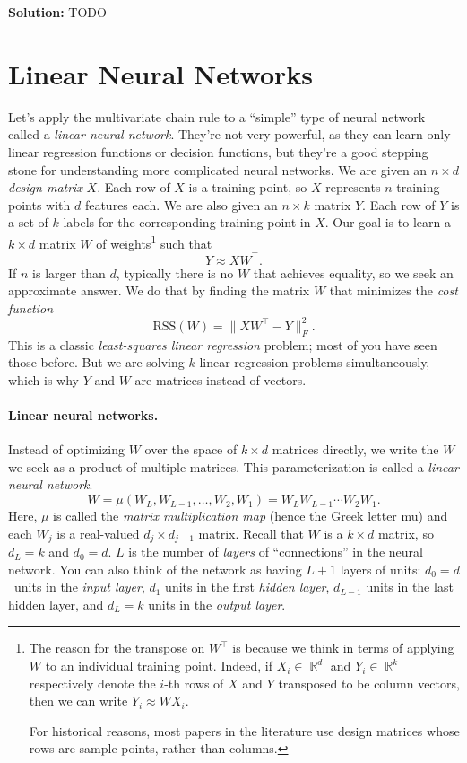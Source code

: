 \documentclass{article}
\newcommand{\Question}[1]{\Large \section{ #1 } \normalsize}
\DeclareMathOperator{\R}{\mathbb{R}}
\newenvironment{solution}{\color{blue} \smallskip \textbf{Solution:}}{}
\begin{document}
\begin{enumerate}
    \begin{solution}
        TODO
    \end{solution}

\end{enumerate}

\newpage
\Question{Linear Neural Networks}
Let's apply the multivariate chain rule to a ``simple'' type of neural network called a {\em linear neural network}.
They're not very powerful, as they can learn only linear regression functions or decision functions, but they're a good stepping stone for understanding more complicated neural networks.
We are given an $n \times d$ {\em design matrix} $X$.
Each row of $X$ is a training point, so $X$ represents $n$ training points with $d$ features each.
We are also given an $n \times k$ matrix $Y$.
Each row of $Y$ is a set of $k$ labels for the corresponding training point in $X$.
Our goal is to learn a $k \times d$ matrix $W$ of weights\footnote{The reason for the transpose on $W^\top$ is because we think
in terms of applying $W$ to an individual training point.
Indeed, if $X_i \in \R^d$ and $Y_i \in \R^k$
respectively denote the $i$-th rows of $X$ and $Y$ transposed to be column vectors, then 
we can write $Y_i \approx W X_i$.

For historical reasons, most papers in the literature use design matrices
whose rows are sample points, rather than columns.} such that
\[
    Y \approx X W^\top.
\]
If $n$ is larger than $d$, typically there is no $W$ that achieves equality,
so we seek an approximate answer.
We do that by finding the matrix $W$ that minimizes the \textit{cost function}
\begin{equation}
    \mathrm{RSS}(W) = \| X W^\top - Y \|^2_F.
    \label{eq:rss}
\end{equation}
This is a classic {\em least-squares linear regression} problem; most of you have seen those before.
But we are solving $k$ linear regression problems simultaneously, which is why $Y$ and $W$ are matrices instead of vectors.

\paragraph{Linear neural networks.}
Instead of optimizing $W$ over the space of ${k \times d}$ matrices directly, we write the $W$ we seek as a product of multiple matrices.
This parameterization is called a \textit{linear neural network}.
\[
    W = \mu(W_L, W_{L-1}, \ldots, W_2, W_1) = W_L W_{L-1} \cdots W_2 W_1.
\]
Here, $\mu$ is called the {\em matrix multiplication map} (hence the Greek letter mu) and each $W_j$ is a real-valued $d_j \times d_{j-1}$ matrix.
Recall that $W$ is a $k \times d$ matrix, so $d_L = k$ and $d_0 = d$.
$L$ is the number of {\em layers} of ``connections'' in the neural network.
You can also think of the network as having $L + 1$ layers of units:
$d_0 = d$~units in the {\em input layer},
$d_1$ units in the first {\em hidden layer},
$d_{L-1}$ units in the last hidden layer, and
$d_L = k$ units in the {\em output layer}.
\end{document}
